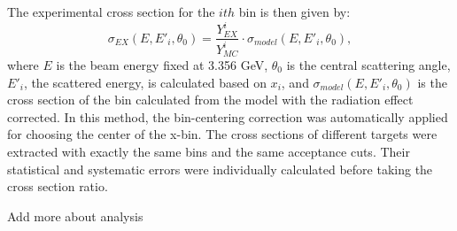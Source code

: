 	The experimental cross section for the $ith$ bin is then given by:
	\begin{equation}
	\sigma_{EX}(E, E'_{i},\theta_{0}) = \frac{Y^{i}_{EX}}{Y^{i}_{MC}}\cdot\sigma_{model}(E, E'_{i},\theta_{0}),
	\end{equation}
	where $E$ is the beam energy fixed at 3.356 GeV, $\theta_{0}$ is the central scattering angle, $E'_{i}$, the scattered energy, is calculated based on $x_{i}$, and $\sigma_{model}(E, E'_{i},\theta_{0})$ is the cross section of the bin calculated from the model with the radiation effect corrected.  In this method, the bin-centering correction was automatically applied for choosing the center of the x-bin. The cross sections of different targets were extracted with exactly the same bins and the same acceptance cuts. Their statistical and systematic errors were individually calculated before taking the cross section ratio.

    Add more about analysis
